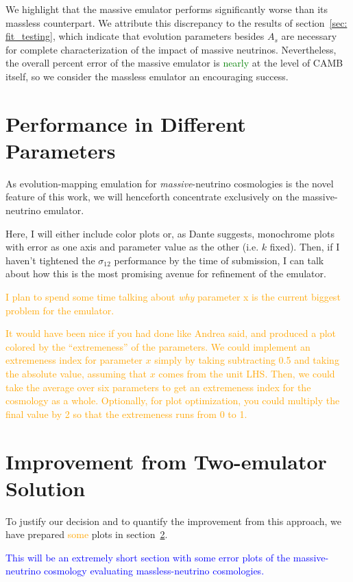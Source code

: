 We highlight that the massive emulator
performs significantly worse than its massless counterpart. We attribute this
discrepancy to the results of section~\ref{sec: fit_testing}, which indicate
that evolution parameters besides $A_s$ are necessary for complete
characterization of the impact of massive neutrinos. Nevertheless, the
overall percent error of the massive emulator is \textcolor{green}{nearly}
at the level of CAMB itself, so we consider the massless emulator an
encouraging success.

\section{Performance in Different Parameters}
\label{sec: param_breakdown}

As evolution-mapping emulation for \textit{massive}-neutrino cosmologies
is the novel feature of this work, we will henceforth concentrate exclusively
on the massive-neutrino emulator.

Here, I will either include color plots or, as Dante suggests, monochrome 
plots with error as one axis and parameter value as the other (i.e. $k$ 
fixed). Then, if I haven't tightened the $\sigma_{12}$ performance by the time 
of submission, I can talk about how this is the most promising avenue for 
refinement of the emulator.

\textcolor{orange}{I plan to spend some time talking 
about \textit{why} parameter x is the current biggest problem for the 
emulator.}

\textcolor{orange}{It would have been nice if you had done like Andrea said,
and produced a plot colored by the ``extremeness'' of the parameters. We
could implement an extremeness index for parameter $x$ simply by taking
subtracting 0.5 and taking the absolute value, assuming that $x$ comes from
the unit LHS. Then, we could take the average over six parameters to get
an extremeness index for the cosmology as a whole. Optionally, for plot
optimization, you could multiply the final value by 2 so that the extremeness
runs from 0 to 1.}


\section{Improvement from Two-emulator Solution}
\label{sec: 2emu_improvement}

To justify our decision and to quantify the improvement from this approach, we
have prepared \textcolor{orange}{some} plots in
section~\ref{sec: 2emu_improvement}.

\textcolor{blue}{This will be an extremely short section with some error
plots of the massive-neutrino cosmology evaluating massless-neutrino
cosmologies.}